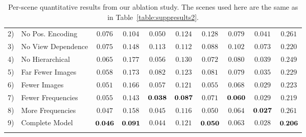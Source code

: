 \begin{table}[t]
{\begin{tabular}{ll|cccccccc}
2) & No Pos. Encoding          &      $0.076$  &      $0.104$  &      $0.050$  &      $0.124$  &      $0.128$  &      $0.079$  &      $0.041$  &      $0.261$  \\
3) & No View Dependence        &      $0.075$  &      $0.148$  &      $0.113$  &      $0.112$  &      $0.088$  &      $0.102$  &      $0.073$  &      $0.220$  \\
4) & No Hierarchical           &      $0.065$  &      $0.177$  &      $0.056$  &      $0.130$  &      $0.072$  &      $0.080$  &      $0.039$  &      $0.249$  \\
\arrayrulecolor{gray}
\hline
\arrayrulecolor{black}
5) & Far Fewer Images          &      $0.058$  &      $0.173$  &      $0.082$  &      $0.123$  &      $0.081$  &      $0.079$  &      $0.035$  &      $0.229$  \\
6) & Fewer Images              &      $0.051$  &      $0.166$  &      $0.057$  &      $0.121$  &      $0.055$  &      $0.068$  &      $0.029$  &      $0.223$  \\
\arrayrulecolor{gray}
\hline
\arrayrulecolor{black}
7) & Fewer Frequencies         &      $0.055$  &      $0.143$  & ${\mathbf{0.038}}$ & ${\mathbf{0.087}}$ &      $0.071$  & ${\mathbf{0.060}}$ &      $0.029$  &      $0.219$  \\
8) & More Frequencies          &      $0.047$  &      $0.158$  &      $0.045$  &      $0.116$  &      $0.050$  &      $0.064$  & ${\mathbf{0.027}}$ &      $0.261$  \\
\arrayrulecolor{gray}
\hline
\arrayrulecolor{black}
9) & Complete Model            & ${\mathbf{0.046}}$ & ${\mathbf{0.091}}$ &      $0.044$  &      $0.121$  & ${\mathbf{0.050}}$ &      $0.063$  &      $0.028$  & ${\mathbf{0.206}}$  \\
\hline
\multicolumn{9}{c}{}
\end{tabular}
} \vspace{2mm}
\caption{Per-scene quantitative results from our ablation study. The scenes used here are the same as in Table~\ref{table:suppresults2}.
}
\label{table:suppresultsabl} 
\end{table}
\setlength{\tabcolsep}{1.4pt}